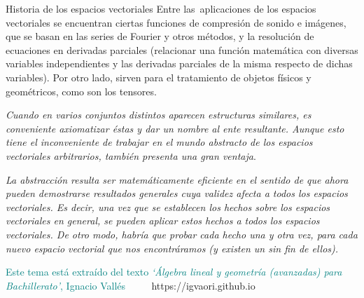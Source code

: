 \begin{myexampleblock}{Historia de los espacios vectoriales}
\vspace{2mm} Entre las aplicaciones de los espacios vectoriales se encuentran ciertas funciones de compresión de sonido e imágenes, que se basan en las series de Fourier y otros métodos, y la resolución de ecuaciones en derivadas parciales (relacionar una función matemática con diversas variables independientes y las derivadas parciales de la misma respecto de dichas variables). Por otro lado, sirven para el tratamiento de objetos físicos y geométricos, como son los tensores.

\vspace{6mm} \emph{Cuando en varios conjuntos distintos aparecen estructuras similares, es conveniente axiomatizar éstas y dar un nombre al ente resultante. Aunque esto tiene el inconveniente de trabajar en el mundo abstracto de los espacios vectoriales arbitrarios, también presenta una gran ventaja}.


\vspace{2mm} \emph{ La abstracción resulta ser matemáticamente eficiente en el sentido de que ahora pueden demostrarse resultados generales cuya validez afecta a todos los espacios vectoriales. Es decir, una vez que se establecen los hechos sobre los espacios vectoriales en general, se pueden aplicar estos hechos a todos los espacios vectoriales. De otro modo, habría que probar cada hecho una y otra vez, para cada nuevo espacio vectorial que nos encontráramos (y existen un sin fin de ellos).}
	
\end{myexampleblock}

\textcolor{teal}{Este tema está extraído del texto \emph{`Álgebra lineal y geometría (avanzadas) para Bachillerato'}, \textsf{Ignacio Vallés}}
$\qquad$ \textcolor{NavyBlue}{https://igvaori.github.io}



